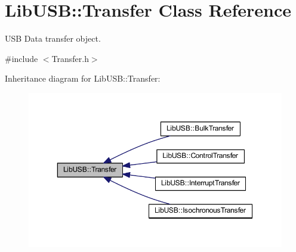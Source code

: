 \hypertarget{class_lib_u_s_b_1_1_transfer}{\section{Lib\-U\-S\-B\-:\-:Transfer Class Reference}
\label{class_lib_u_s_b_1_1_transfer}
}


U\-S\-B Data transfer object.  




{\ttfamily \#include $<$Transfer.\-h$>$}



Inheritance diagram for Lib\-U\-S\-B\-:\-:Transfer\-:\nopagebreak
\begin{figure}[H]
\begin{center}
\leavevmode
\includegraphics[width=350pt]{class_lib_u_s_b_1_1_transfer__inherit__graph}
\end{center}
\end{figure}
